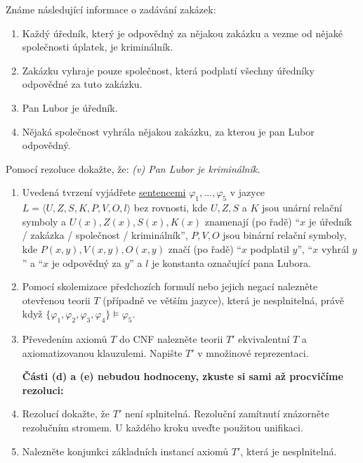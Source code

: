 \documentclass[a4paper,12pt]{article}
\begin{document}
{\medskip\begin{problem}[3 body]  
    Známe následující informace o zadávání zakázek:
    \begin{enumerate}[label=(\roman*)] \it
        \item Každý úředník, který je odpovědný za nějakou zakázku a vezme od nějaké společnosti úplatek, je kriminálník.
        \item Zakázku vyhraje pouze společnost, která podplatí všechny úředníky odpovědné za tuto zakázku.
        \item Pan Lubor je úředník.
        \item Nějaká společnost vyhrála nějakou zakázku, za kterou je pan Lubor odpovědný.
    \end{enumerate}
    Pomocí rezoluce dokažte, že: {\it (v) Pan Lubor je kriminálník.}
    \begin{enumerate}
        \item Uvedená tvrzení vyjádřete \underline{sentencemi} $\varphi_1, \dots, \varphi_5$ v jazyce $L=\langle U, Z, S, K, P, V, O, l \rangle$ bez rovnosti, kde $U, Z, S$ a $K$ jsou unární relační symboly a $U(x), Z(x), S(x), K(x)$ znamenají (po řadě) ``$x$ je úředník / zakázka / společnost / kriminálník'', $P, V, O$ jsou binární relační symboly, kde $P(x,y), V(x,y), O(x,y)$ značí (po řadě) ``$x$ podplatil $y$'', ``$x$ vyhrál $y$'' a ``$x$ je odpovědný za $y$'' a $l$ je konstanta označující pana Lubora.
        \item Pomocí skolemizace předchozích formulí nebo jejich negací nalezněte otevřenou teorii $T$ (případně ve větším jazyce), která je nesplnitelná, právě když  $\{\varphi_1, \varphi_2, \varphi_3, \varphi_4\} \models \varphi_5$.
        \item Převedením axiomů $T$ do CNF nalezněte teorii $T'$ ekvivalentní $T$ a axiomatizovanou klauzulemi. Napište $T'$ v množinové reprezentaci.
        
        \bigskip

        \textbf{Části (d) a (e) nebudou hodnoceny, zkuste si sami až procvičíme rezoluci:}
        \item Rezolucí dokažte, že $T'$ není splnitelná. Rezoluční zamítnutí znázorněte rezolučním stromem. U každého kroku uveďte použitou unifikaci.
        \item Nalezněte konjunkci základních instancí axiomů $T'$, která je nesplnitelná.
    \end{enumerate}
\end{problem}


}
\end{document}
